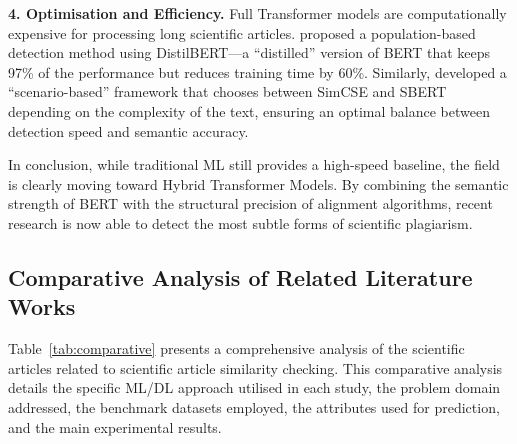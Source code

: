 \documentclass[12pt, a4paper]{article}
\begin{document}
\textbf{4. Optimisation and Efficiency.} Full Transformer models are computationally expensive for processing long scientific articles. \citet{JingLiu2023} proposed a population-based detection method using DistilBERT---a ``distilled'' version of BERT that keeps 97\% of the performance but reduces training time by 60\%. Similarly, \citet{LiuZhu2023} developed a ``scenario-based'' framework that chooses between SimCSE and SBERT depending on the complexity of the text, ensuring an optimal balance between detection speed and semantic accuracy.

In conclusion, while traditional ML still provides a high-speed baseline, the field is clearly moving toward Hybrid Transformer Models. By combining the semantic strength of BERT with the structural precision of alignment algorithms, recent research is now able to detect the most subtle forms of scientific plagiarism.

\subsection{Comparative Analysis of Related Literature Works}

Table~\ref{tab:comparative} presents a comprehensive analysis of the scientific articles related to scientific article similarity checking. This comparative analysis details the specific ML/DL approach utilised in each study, the problem domain addressed, the benchmark datasets employed, the attributes used for prediction, and the main experimental results.
\end{document}
